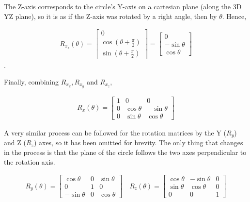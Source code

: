 \documentclass[12pt, a4paper]{article}
\begin{document}
The Z-axis corresponds to the circle's Y-axis on a cartesian plane (along the 3D
YZ plane), so it is as if the Z-axis was rotated by a right angle, then by
$\theta$. Hence,

\begin{align*}
    R_{x_z}(\theta)
    = \begin{bmatrix}
          0                            \\
          \cos(\theta + \frac{\pi}{2}) \\
          \sin(\theta + \frac{\pi}{2})
      \end{bmatrix}
    = \begin{bmatrix}
          0           \\
          -\sin\theta \\
          \cos\theta
      \end{bmatrix}
\end{align*}.

Finally, combining $R_{x_x}, R_{x_y}$ and $R_{x_z}$,

\begin{align*}
    R_x(\theta)
    = \begin{bmatrix}
          1 & 0          & 0           \\
          0 & \cos\theta & -\sin\theta \\
          0 & \sin\theta & \cos\theta
      \end{bmatrix}
\end{align*}

A very similar process can be followed for the rotation matrices by the Y
($R_y$) and Z ($R_z$) axes, so it has been omitted for brevity. The only thing
that changes in the process is that the plane of the circle follows the two axes
perpendicular to the rotation axis.

\begin{align*}
    R_y(\theta) = \begin{bmatrix}
                      \cos \theta  & 0 & \sin \theta \\
                      0            & 1 & 0           \\
                      -\sin \theta & 0 & \cos \theta
                  \end{bmatrix}
    \quad
    R_z(\theta) = \begin{bmatrix}
                      \cos \theta & -\sin \theta & 0 \\
                      \sin \theta & \cos \theta  & 0 \\
                      0           & 0            & 1
                  \end{bmatrix}
\end{align*}
\end{document}
